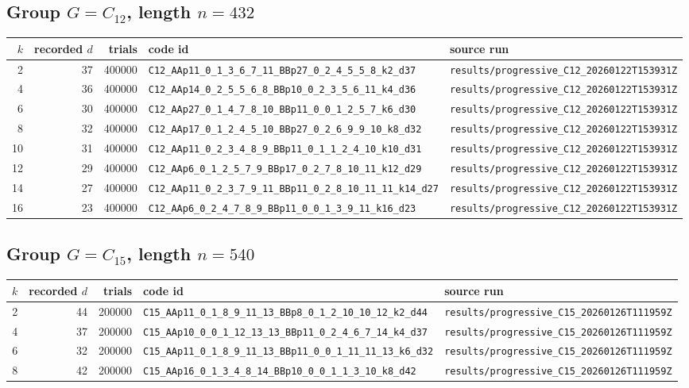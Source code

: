 \documentclass[11pt]{article}
\begin{document}
\subsection{Group $G = C_{12}$, length $n=432$}

\begin{longtable}{@{}r r r l l@{}}
\toprule
$k$ & recorded $d$ & trials & code id & source run \\
\midrule
\endhead
2 & 37 & 400000 & \texttt{C12\_AAp11\_0\_1\_3\_6\_7\_11\_BBp27\_0\_2\_4\_5\_5\_8\_k2\_d37} & \texttt{results/progressive\_C12\_20260122T153931Z} \\
4 & 36 & 400000 & \texttt{C12\_AAp14\_0\_2\_5\_5\_6\_8\_BBp10\_0\_2\_3\_5\_6\_11\_k4\_d36} & \texttt{results/progressive\_C12\_20260122T153931Z} \\
6 & 30 & 400000 & \texttt{C12\_AAp27\_0\_1\_4\_7\_8\_10\_BBp11\_0\_0\_1\_2\_5\_7\_k6\_d30} & \texttt{results/progressive\_C12\_20260122T153931Z} \\
8 & 32 & 400000 & \texttt{C12\_AAp17\_0\_1\_2\_4\_5\_10\_BBp27\_0\_2\_6\_9\_9\_10\_k8\_d32} & \texttt{results/progressive\_C12\_20260122T153931Z} \\
10 & 31 & 400000 & \texttt{C12\_AAp11\_0\_2\_3\_4\_8\_9\_BBp11\_0\_1\_1\_2\_4\_10\_k10\_d31} & \texttt{results/progressive\_C12\_20260122T153931Z} \\
12 & 29 & 400000 & \texttt{C12\_AAp6\_0\_1\_2\_5\_7\_9\_BBp17\_0\_2\_7\_8\_10\_11\_k12\_d29} & \texttt{results/progressive\_C12\_20260122T153931Z} \\
14 & 27 & 400000 & \texttt{C12\_AAp11\_0\_2\_3\_7\_9\_11\_BBp11\_0\_2\_8\_10\_11\_11\_k14\_d27} & \texttt{results/progressive\_C12\_20260122T153931Z} \\
16 & 23 & 400000 & \texttt{C12\_AAp6\_0\_2\_4\_7\_8\_9\_BBp11\_0\_0\_1\_3\_9\_11\_k16\_d23} & \texttt{results/progressive\_C12\_20260122T153931Z} \\
\bottomrule
\end{longtable}

\subsection{Group $G = C_{15}$, length $n=540$}

\begin{longtable}{@{}r r r l l@{}}
\toprule
$k$ & recorded $d$ & trials & code id & source run \\
\midrule
\endhead
2 & 44 & 200000 & \texttt{C15\_AAp11\_0\_1\_8\_9\_11\_13\_BBp8\_0\_1\_2\_10\_10\_12\_k2\_d44} & \texttt{results/progressive\_C15\_20260126T111959Z} \\
4 & 37 & 200000 & \texttt{C15\_AAp10\_0\_0\_1\_12\_13\_13\_BBp11\_0\_2\_4\_6\_7\_14\_k4\_d37} & \texttt{results/progressive\_C15\_20260126T111959Z} \\
6 & 32 & 200000 & \texttt{C15\_AAp11\_0\_1\_8\_9\_11\_13\_BBp11\_0\_0\_1\_11\_11\_13\_k6\_d32} & \texttt{results/progressive\_C15\_20260126T111959Z} \\
8 & 42 & 200000 & \texttt{C15\_AAp16\_0\_1\_3\_4\_8\_14\_BBp10\_0\_0\_1\_1\_3\_10\_k8\_d42} & \texttt{results/progressive\_C15\_20260126T111959Z} \\
\bottomrule
\end{longtable}
\end{document}
